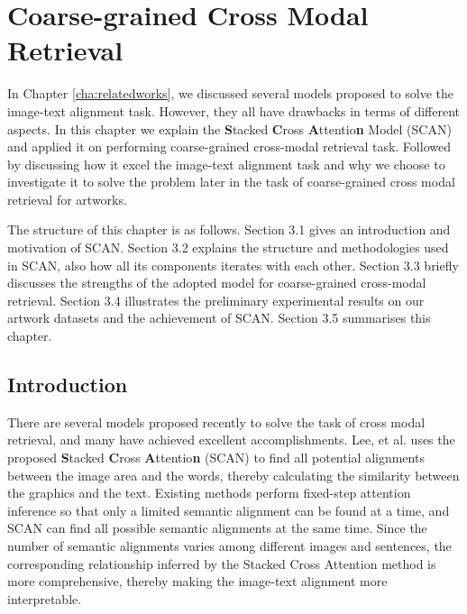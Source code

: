 \chapter{Coarse-grained Cross Modal Retrieval}
\label{cha:scan}
In Chapter \ref{cha:relatedworks}, we discussed several models proposed to solve the image-text alignment task. However, they all have drawbacks in terms of different aspects. In this chapter we explain the \textbf{S}tacked \textbf{C}ross \textbf{A}ttentio\textbf{n} Model (SCAN) \cite{scan} and applied it on performing coarse-grained cross-modal retrieval task. 
Followed by discussing how it excel the image-text alignment task and why we choose to investigate it to solve the problem later in the task of coarse-grained cross modal retrieval for artworks.

The structure of this chapter is as follows. Section 3.1 gives an introduction and motivation of SCAN. Section 3.2 explains the structure and methodologies used in SCAN, also how all its components iterates with each other. Section 3.3 briefly discusses the strengths of the adopted model for coarse-grained cross-modal retrieval. Section 3.4 illustrates the preliminary experimental results on our artwork datasets and the achievement of SCAN. Section 3.5 summarises this chapter.


\section{Introduction}

There are several models proposed recently to solve the task of cross modal retrieval, and many have achieved excellent accomplishments. Lee, et al. \cite{scan} uses the proposed \textbf{S}tacked \textbf{C}ross \textbf{A}ttentio\textbf{n} (SCAN) to find all potential alignments between the image area and the words, thereby calculating the similarity between the graphics and the text. Existing methods perform fixed-step attention inference so that only a limited semantic alignment can be found at a time, and SCAN can find all possible semantic alignments at the same time. Since the number of semantic alignments varies among different images and sentences, the corresponding relationship inferred by the Stacked Cross Attention method is more comprehensive, thereby making the image-text alignment more interpretable.

